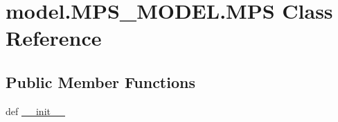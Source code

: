 \hypertarget{classmodel_1_1MPS__MODEL_1_1MPS}{}\section{model.\+M\+P\+S\+\_\+\+M\+O\+D\+E\+L.\+M\+P\+S Class Reference}
\label{classmodel_1_1MPS__MODEL_1_1MPS}
\subsection*{Public Member Functions}
\begin{DoxyCompactItemize}
\item 
def \hyperlink{classmodel_1_1MPS__MODEL_1_1MPS_a0ff78f4aab132a5723c33fe473f20a6c}{\+\_\+\+\_\+init\+\_\+\+\_\+}
\end{DoxyCompactItemize}
